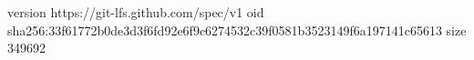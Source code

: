 version https://git-lfs.github.com/spec/v1
oid sha256:33f61772b0de3d3f6fd92e6f9c6274532c39f0581b3523149f6a197141c65613
size 349692
